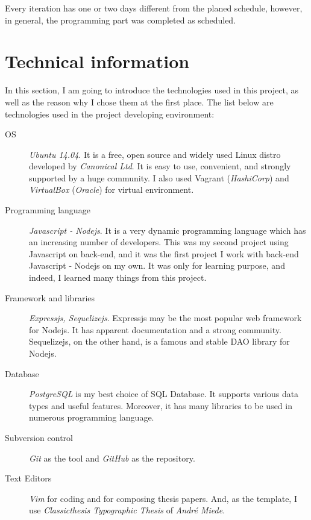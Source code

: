 Every iteration has one or two days different from the planed schedule, however, in general, the programming part was completed as scheduled.


\section{Technical information}
\label{ch:implementation:technical_information} 

In this section, I am going to introduce the technologies used in this project, as well as the reason why I chose them at the first place.
The list below are technologies used in the project developing environment:

\begin{description}
\item[OS] \emph{Ubuntu 14.04}.
It is a free, open source and widely used Linux distro developed by \emph{Canonical Ltd}.
It is easy to use, convenient, and strongly supported by a huge community.
I also used {Vagrant} (\emph{HashiCorp}) and \emph{VirtualBox} (\emph{Oracle}) for virtual environment.
\item[Programming language] \emph{Javascript - Nodejs}.
It is a very dynamic programming language which has an increasing number of developers.
This was my second project using Javascript on back-end, and it was the first project I work with back-end Javascript - Nodejs on my own. It was only for learning purpose, and indeed, I learned many things from this project.
\item[Framework and libraries] \emph{Expressjs, Sequelizejs}.
Expressjs may be the most popular web framework for Nodejs.
It has apparent documentation and a strong community.
Sequelizejs, on the other hand, is a famous and stable DAO library for Nodejs.
\item[Database] \emph{PostgreSQL} is my best choice of SQL Database.
It supports various data types and useful features.
Moreover, it has many libraries to be used in numerous programming language.
\item[Subversion control] \emph{Git} as the tool and \emph{GitHub} as the repository.
\item[Text Editors] \emph{Vim} for coding and \latex for composing thesis papers. And, as the \latex template, I use \emph{Classicthesis Typographic Thesis} of \emph{Andr\'{e} Miede}.

\end{description}

